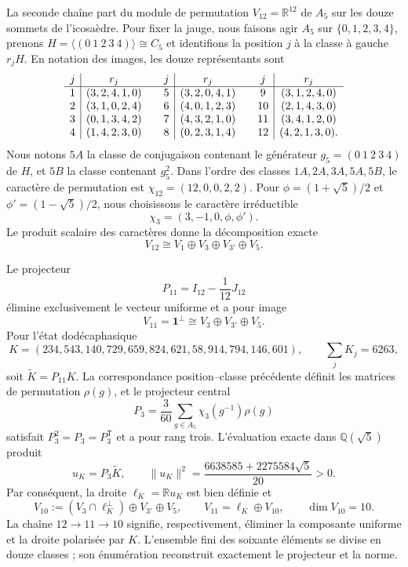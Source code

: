 La seconde chaîne part du module de permutation
\(V_{12}=\mathbb R^{12}\) de \(A_5\) sur les douze sommets de l'icosaèdre.
Pour fixer la jauge, nous faisons agir \(A_5\) sur
\(\{0,1,2,3,4\}\), prenons
\(H=\langle(0\ 1\ 2\ 3\ 4)\rangle\cong C_5\) et identifions la position
\(j\) à la classe à gauche \(r_jH\). En notation des images, les douze
représentants sont
\[
\begin{array}{c|c@{\qquad}c|c@{\qquad}c|c}
j&r_j&j&r_j&j&r_j\\ \hline
1&(3,2,4,1,0)&5&(3,2,0,4,1)&9&(3,1,2,4,0)\\
2&(3,1,0,2,4)&6&(4,0,1,2,3)&10&(2,1,4,3,0)\\
3&(0,1,3,4,2)&7&(4,3,2,1,0)&11&(3,4,1,2,0)\\
4&(1,4,2,3,0)&8&(0,2,3,1,4)&12&(4,2,1,3,0).
\end{array}
\]
Nous notons \(5A\) la classe de conjugaison contenant le générateur
\(g_5=(0\ 1\ 2\ 3\ 4)\) de \(H\), et \(5B\) la classe contenant
\(g_5^2\). Dans l'ordre des classes \(1A,2A,3A,5A,5B\), le caractère de permutation est
\(\chi_{12}=(12,0,0,2,2)\). Pour
\(\phi=(1+\sqrt5)/2\) et \(\phi'=(1-\sqrt5)/2\), nous choisissons le caractère
irréductible
\[
 \chi_3=(3,-1,0,\phi,\phi').
\]
Le produit scalaire des caractères donne la décomposition exacte
\[
 V_{12}\cong V_1\oplus V_3\oplus V_{3'}\oplus V_5.
\]

Le projecteur
\[
 P_{11}=I_{12}-\frac1{12}J_{12}
\]
élimine exclusivement le vecteur uniforme et a pour image
\[
 V_{11}=\mathbf1^\perp\cong V_3\oplus V_{3'}\oplus V_5.
\]
Pour l'état dodécaphasique
\[
 K=(234,543,140,729,659,824,621,58,914,794,146,601),
 \qquad \sum_jK_j=6263,
\]
soit \(\widetilde K=P_{11}K\). La correspondance position--classe précédente
définit les matrices de permutation \(\rho(g)\), et le projecteur central
\[
 P_3=\frac3{60}\sum_{g\in A_5}\chi_3(g^{-1})\rho(g)
\]
satisfait \(P_3^2=P_3=P_3^{\mathsf T}\) et a pour rang trois. L'évaluation
exacte dans \(\mathbb Q(\sqrt5)\) produit
\[
 u_K=P_3\widetilde K,
 \qquad
 \|u_K\|^2=\frac{6638585+2275584\sqrt5}{20}>0.
\]
Par conséquent, la droite \(\ell_K=\mathbb Ru_K\) est bien définie et
\[
 V_{10}:=(V_3\cap\ell_K^\perp)\oplus V_{3'}\oplus V_5,
 \qquad
 V_{11}=\ell_K\oplus V_{10},
 \qquad \dim V_{10}=10.
\]
La chaîne \(12\to11\to10\) signifie, respectivement, éliminer la
composante uniforme et la droite polarisée par \(K\). L'ensemble fini des
soixante éléments se divise en douze classes ; son énumération
reconstruit exactement le projecteur et la norme.

